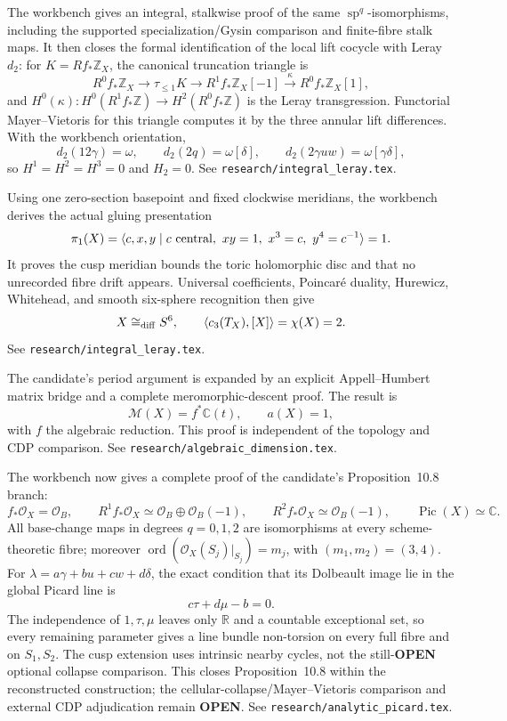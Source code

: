 {\ResultSmall
The workbench gives an integral, stalkwise proof of the same
\(\operatorname{sp}^q\)-isomorphisms, including the supported
specialization/Gysin comparison and finite-fibre stalk maps.  It then closes
the formal identification of the local lift cocycle with Leray $d_2$: for
\(K=Rf_*\mathbb Z_X\), the canonical truncation triangle is
\[
 R^0f_*\mathbb Z_X\longrightarrow\tau_{\le1}K
 \longrightarrow R^1f_*\mathbb Z_X[-1]
 \xrightarrow{\kappa}R^0f_*\mathbb Z_X[1],
\]
and $H^0(\kappa):H^0(R^1f_*\mathbb Z)\to H^2(R^0f_*\mathbb Z)$ is the
Leray transgression.  Functorial Mayer--Vietoris for this triangle computes
it by the three annular lift differences.  With the workbench orientation,
\[
 d_2(12\gamma)=\omega,\qquad
 d_2(2q)=\omega[\delta],\qquad
 d_2(2\gamma uw)=\omega[\gamma\delta],
\]
so $H^1=H^2=H^3=0$ and $H_2=0$.  See
\texttt{research/integral\_leray.tex}.
}

{\ResultSmall
Using one zero-section basepoint and fixed clockwise meridians, the workbench
derives the actual gluing presentation
\[
 \pi_1(X)=\langle c,x,y\mid c\ {\rm central},\ xy=1,\ x^3=c,\ y^4=c^{-1}\rangle=1.
\]
It proves the cusp meridian bounds the toric holomorphic disc and that no
unrecorded fibre drift appears.  Universal coefficients, Poincar\'e duality,
Hurewicz, Whitehead, and smooth six-sphere recognition then give
\[
 X\cong_{\rm diff}S^6,
 \qquad \langle c_3(T_X),[X]\rangle=\chi(X)=2.
\]
See \texttt{research/integral\_leray.tex}.
}

{\ResultSmall
The candidate's period argument is expanded by an explicit Appell--Humbert
matrix bridge and a complete meromorphic-descent proof.  The result is
\[
 \mathcal M(X)=f^*\mathbb C(t),\qquad a(X)=1,
\]
with $f$ the algebraic reduction.  This proof is independent of the
topology and CDP comparison.  See
\texttt{research/algebraic\_dimension.tex}.
}

{\ResultSmall
The workbench now gives a complete proof of the candidate's
Proposition~10.8 branch:
\[
 f_*\mathcal O_X=\mathcal O_B,\qquad
 R^1f_*\mathcal O_X\simeq\mathcal O_B\oplus\mathcal O_B(-1),\qquad
 R^2f_*\mathcal O_X\simeq\mathcal O_B(-1),\qquad
 \operatorname{Pic}(X)\simeq\mathbb C.
\]
All base-change maps in degrees \(q=0,1,2\) are isomorphisms at every
scheme-theoretic fibre; moreover
\(\operatorname{ord}(\mathcal O_X(S_j)|_{S_j})=m_j\), with
\((m_1,m_2)=(3,4)\).  For
\(\lambda=a\gamma+bu+cw+d\delta\), the exact condition that its Dolbeault
image lie in the global Picard line is
\[
 c\tau+d\mu-b=0.
\]
The independence of \(1,\tau,\mu\) leaves only \(\mathbb R\) and a countable
exceptional set, so every remaining parameter gives a line bundle
non-torsion on every full fibre and on \(S_1,S_2\).  The cusp extension uses
intrinsic nearby cycles, not the still-\textbf{OPEN} optional collapse comparison.
This closes Proposition~10.8 within the reconstructed construction; the
cellular-collapse/Mayer--Vietoris comparison and external CDP adjudication
remain \textbf{OPEN}.  See \texttt{research/analytic\_picard.tex}.
}

